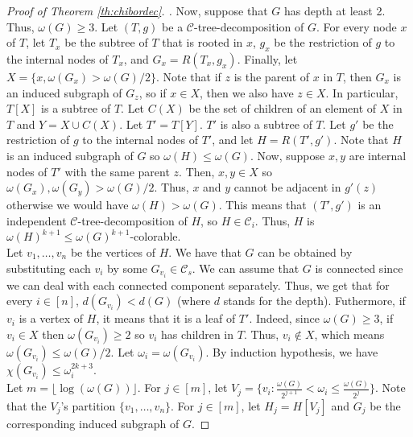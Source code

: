 \documentclass[11pt]{article}
\numberwithin{equation}{section}
\begin{document}
\begin{proof}[Proof of Theorem \ref{th:chibordec}. ]
Now, suppose that $G$ has depth at least 2. Thus, $\omega(G) \geq 3$. Let $(T, g)$ be a $\mathcal{C}$-tree-decomposition of $G$. For every node $x$ of $T$, let $T_x$ be the subtree of $T$ that is rooted in $x$, $g_x$ be the restriction of $g$ to the internal nodes of $T_x$, and $G_x = R(T_x, g_x)$. Finally, let $X = \{x, \omega(G_x) > \omega(G)/2\}$. Note that if $z$ is the parent of $x$ in $T$, then $G_x$ is an induced subgraph of $G_z$, so if $x \in X$, then we also have $z \in X$. In particular, $T[X]$ is a subtree of $T$. Let $C(X)$ be the set of children of an element of $X$ in $T$ and $Y = X \cup C(X)$. Let $T' = T[Y]$. $T'$ is also a subtree of $T$. Let $g'$ be the restriction of $g$ to the internal nodes of $T'$, and let $H = R(T', g')$. Note that $H$ is an induced subgraph of $G$ so $\omega(H) \leq \omega(G)$. Now, suppose $x, y$ are internal nodes of $T'$ with the same parent $z$. Then, $x, y \in X$ so $\omega(G_x), \omega(G_y) > \omega(G)/2$. Thus, $x$ and $y$ cannot be adjacent in $g'(z)$ otherwise we would have $\omega(H) > \omega(G)$. This means that $(T', g')$ is an independent $\mathcal{C}$-tree-decomposition of $H$, so $H \in \mathcal{C}_i$. Thus, $H$ is $\omega(H)^{k+1} \leq \omega(G)^{k+1}$-colorable. \\
Let $v_1, \ldots, v_n$ be the vertices of $H$. We have that $G$ can be obtained by substituting each $v_i$ by some $G_{v_i} \in \mathcal{C}_s$. We can assume that $G$ is connected since we can deal with each connected component separately. Thus, we get that for every $i \in [n]$, $d(G_{v_i}) < d(G)$ (where $d$ stands for the depth). Futhermore, if $v_i$ is a vertex of $H$, it means that it is a leaf of $T'$. Indeed, since $\omega(G) \geq 3$, if $v_i \in X$ then $\omega(G_{v_i}) \geq 2$ so $v_i$ has children in $T$. Thus, $v_i \notin X$, which means $\omega(G_{v_i}) \leq \omega(G)/2$. Let $\omega_i = \omega(G_{v_i})$. By induction hypothesis, we have $\chi(G_{v_i}) \leq \omega_i^{2k+3}$. \\
Let $m = \lfloor\log(\omega(G))\rfloor$. For $j \in [m]$, let $V_j = \{v_i: \frac{\omega(G)}{2^{j+1}} < \omega_i \leq \frac{\omega(G)}{2^j}\}$. Note that the $V_j$'s partition  $\{v_1, \ldots, v_n\}$. For $j \in [m]$, let $H_j = H[V_j]$ and $G_j$ be the corresponding induced subgraph of $G$. 


\end{proof}
\end{document}

